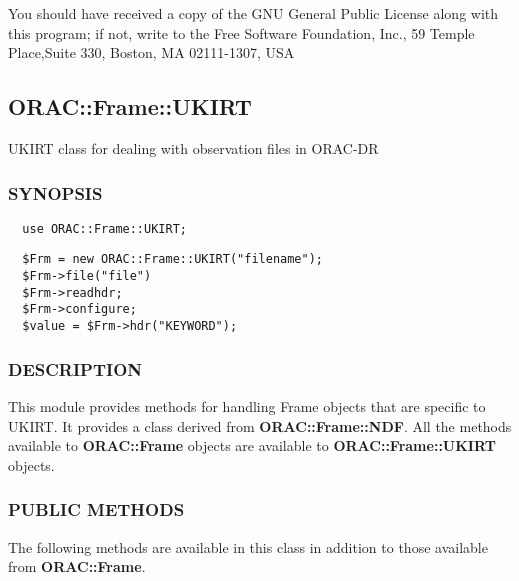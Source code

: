 You should have received a copy of the GNU General Public License along with
this program; if not, write to the Free Software Foundation, Inc., 59 Temple
Place,Suite 330, Boston, MA  02111-1307, USA

\subsection{ORAC::Frame::UKIRT\label{ORAC::Frame::UKIRT}}


UKIRT class for dealing with observation files in ORAC-DR

\subsubsection*{SYNOPSIS\label{ORAC::Frame::UKIRT_SYNOPSIS}}
\begin{verbatim}
  use ORAC::Frame::UKIRT;
\end{verbatim}
\begin{verbatim}
  $Frm = new ORAC::Frame::UKIRT("filename");
  $Frm->file("file")
  $Frm->readhdr;
  $Frm->configure;
  $value = $Frm->hdr("KEYWORD");
\end{verbatim}
\subsubsection*{DESCRIPTION\label{ORAC::Frame::UKIRT_DESCRIPTION}}


This module provides methods for handling Frame objects that
are specific to UKIRT. It provides a class derived from \textbf{ORAC::Frame::NDF}.
All the methods available to \textbf{ORAC::Frame} objects are available
to \textbf{ORAC::Frame::UKIRT} objects.

\subsubsection*{PUBLIC METHODS\label{ORAC::Frame::UKIRT_PUBLIC_METHODS}}


The following methods are available in this class in addition to
those available from \textbf{ORAC::Frame}.

